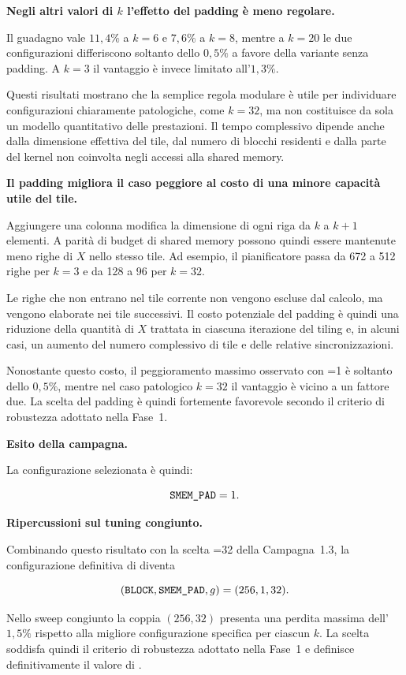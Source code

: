 \textbf{Negli altri valori di $k$ l'effetto del padding è meno regolare.}

Il guadagno vale $11{,}4\%$ a $k=6$ e $7{,}6\%$ a $k=8$, mentre a
$k=20$ le due configurazioni differiscono soltanto dello $0{,}5\%$ a favore
della variante senza padding. A $k=3$ il vantaggio è invece limitato
all'$1{,}3\%$.

Questi risultati mostrano che la semplice regola modulare è utile per
individuare configurazioni chiaramente patologiche, come $k=32$, ma non
costituisce da sola un modello quantitativo delle prestazioni. Il tempo
complessivo dipende anche dalla dimensione effettiva del tile, dal numero di
blocchi residenti e dalla parte del kernel non coinvolta negli accessi alla
shared memory.

\textbf{Il padding migliora il caso peggiore al costo di una minore capacità
utile del tile.}

Aggiungere una colonna modifica la dimensione di ogni riga da $k$ a $k+1$
elementi. A parità di budget di shared memory possono quindi essere mantenute
meno righe di $X$ nello stesso tile. Ad esempio, il pianificatore passa da
672 a 512 righe per $k=3$ e da 128 a 96 per $k=32$.

Le righe che non entrano nel tile corrente non vengono escluse dal calcolo,
ma vengono elaborate nei tile successivi. Il costo potenziale del padding è
quindi una riduzione della quantità di $X$ trattata in ciascuna iterazione del
tiling e, in alcuni casi, un aumento del numero complessivo di tile e delle
relative sincronizzazioni.

Nonostante questo costo, il peggioramento massimo osservato con
=1 è soltanto dello $0{,}5\%$, mentre nel caso patologico
$k=32$ il vantaggio è vicino a un fattore due. La scelta del padding è quindi
fortemente favorevole secondo il criterio di robustezza adottato nella
Fase~1.

\textbf{Esito della campagna.}

La configurazione selezionata è quindi:

\[
\texttt{SMEM\_PAD}=1.
\]

\textbf{Ripercussioni sul tuning congiunto.}

Combinando questo risultato con la scelta
=32 della Campagna~1.3, la configurazione definitiva di
 diventa

\[
(\texttt{BLOCK},\texttt{SMEM\_PAD},g)=(256,1,32).
\]


Nello sweep congiunto la coppia $(256,32)$ presenta una perdita massima
dell'$1{,}5\%$ rispetto alla migliore configurazione specifica per ciascun
$k$. La scelta soddisfa quindi il criterio di robustezza adottato nella
Fase~1 e definisce definitivamente il valore di
.

